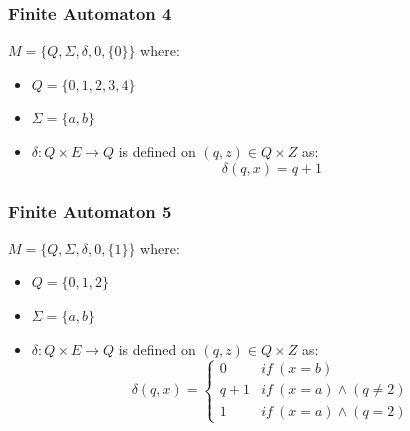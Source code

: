 \documentclass[letterpaper, 12pt]{math}
\begin{document}
\subsubsection*{Finite Automaton 4}
\( M = \{Q,\Sigma,\delta,0,\{0\}\} \) where:
\begin{itemize}
  \item \( Q = \{0,1,2,3,4\} \)
  \item \( \Sigma = \{a,b\} \)
  \item \( \delta: Q\times E\to Q \) is defined on \( (q,z)\in Q\times Z \) as:
    \[ \delta(q,x) = q+1 \]
\end{itemize}

\subsubsection*{Finite Automaton 5}
\( M = \{Q,\Sigma,\delta,0,\{1\}\} \) where:
\begin{itemize}
  \item \( Q = \{0,1,2\} \)
  \item \( \Sigma = \{a,b\} \)
  \item \( \delta: Q\times E\to Q \) is defined on \( (q,z)\in Q\times Z \) as:
    \[ \delta(q,x) = \begin{cases}
      0 & if\ (x = b) \\
      q+1 & if\ (x = a) \wedge (q \ne 2) \\
      1 & if\ (x = a) \wedge (q = 2)
    \end{cases} \]
\end{itemize}
\end{document}
